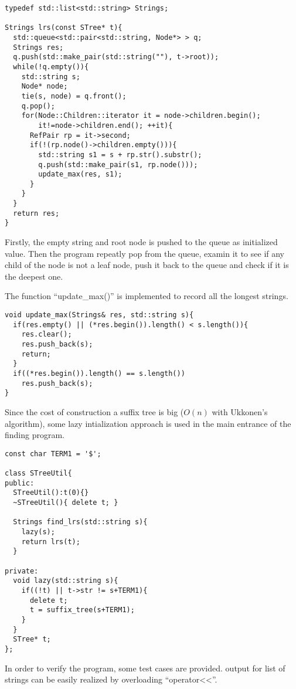 \documentclass{article}
\begin{document}
\lstset{language=C++}
\begin{lstlisting}
typedef std::list<std::string> Strings;

Strings lrs(const STree* t){
  std::queue<std::pair<std::string, Node*> > q;
  Strings res;
  q.push(std::make_pair(std::string(""), t->root));
  while(!q.empty()){
    std::string s;
    Node* node;
    tie(s, node) = q.front();
    q.pop();
    for(Node::Children::iterator it = node->children.begin();
        it!=node->children.end(); ++it){
      RefPair rp = it->second;
      if(!(rp.node()->children.empty())){
        std::string s1 = s + rp.str().substr();
        q.push(std::make_pair(s1, rp.node()));
        update_max(res, s1);
      }
    }
  }
  return res;
} 
\end{lstlisting}

Firstly, the empty string and root node is pushed to the queue
as initialized value. Then the program repeatly pop from the queue,
examin it to see if any child of the node is not a leaf node,
push it back to the queue and check if it is the deepest one.

The function ``update\_max()'' is implemented to record all the
longest strings.

\begin{lstlisting}
void update_max(Strings& res, std::string s){
  if(res.empty() || (*res.begin()).length() < s.length()){
    res.clear();
    res.push_back(s);
    return;
  }
  if((*res.begin()).length() == s.length())
    res.push_back(s);
}
\end{lstlisting}

Since the cost of construction a suffix tree is big ($O(n)$ with
Ukkonen's algorithm), some lazy intialization approach is used in
the main entrance of the finding program.

\begin{lstlisting}
const char TERM1 = '$';

class STreeUtil{
public:
  STreeUtil():t(0){}
  ~STreeUtil(){ delete t; }

  Strings find_lrs(std::string s){
    lazy(s);
    return lrs(t);
  }

private:
  void lazy(std::string s){
    if((!t) || t->str != s+TERM1){
      delete t;
      t = suffix_tree(s+TERM1);
    }
  }
  STree* t;
};
\end{lstlisting} %

In order to verify the program, some test cases are provided. output
for list of strings can be easily realized by overloading ``operator<<''.
\end{document}
